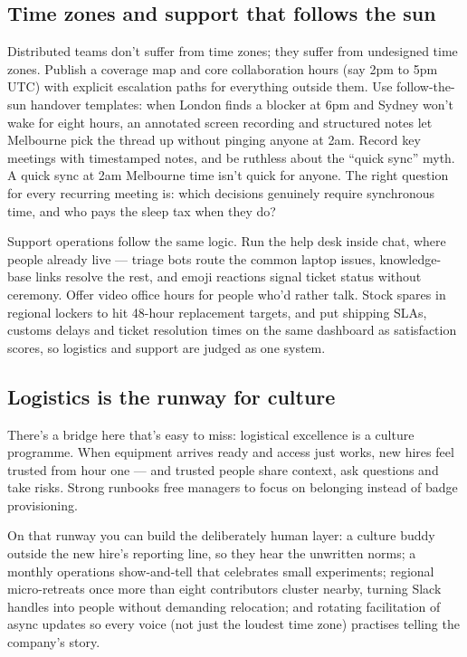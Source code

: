 \subsection{Time zones and support that follows the sun}


Distributed teams don't suffer from time zones; they suffer from undesigned time zones. Publish a coverage map and core collaboration hours (say 2pm to 5pm UTC) with explicit escalation paths for everything outside them. Use follow-the-sun handover templates: when London finds a blocker at 6pm and Sydney won't wake for eight hours, an annotated screen recording and structured notes let Melbourne pick the thread up without pinging anyone at 2am. Record key meetings with timestamped notes, and be ruthless about the ``quick sync'' myth. A quick sync at 2am Melbourne time isn't quick for anyone. The right question for every recurring meeting is: which decisions genuinely require synchronous time, and who pays the sleep tax when they do?


Support operations follow the same logic. Run the help desk inside chat, where people already live — triage bots route the common laptop issues, knowledge-base links resolve the rest, and emoji reactions signal ticket status without ceremony. Offer video office hours for people who'd rather talk. Stock spares in regional lockers to hit 48-hour replacement targets, and put shipping SLAs, customs delays and ticket resolution times on the same dashboard as satisfaction scores, so logistics and support are judged as one system.



\subsection{Logistics is the runway for culture}


There's a bridge here that's easy to miss: logistical excellence is a culture programme. When equipment arrives ready and access just works, new hires feel trusted from hour one — and trusted people share context, ask questions and take risks. Strong runbooks free managers to focus on belonging instead of badge provisioning.


On that runway you can build the deliberately human layer: a culture buddy outside the new hire's reporting line, so they hear the unwritten norms; a monthly operations show-and-tell that celebrates small experiments; regional micro-retreats once more than eight contributors cluster nearby, turning Slack handles into people without demanding relocation; and rotating facilitation of async updates so every voice (not just the loudest time zone) practises telling the company's story.



